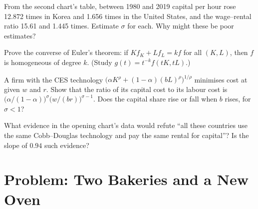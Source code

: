 \begin{exercise}[$\star\star$]\label{exo:b1:technology:estimate}
From the second chart's table, between 1980 and 2019 capital per hour rose
12.872 times in Korea and 1.656 times in the United States, and the
wage--rental ratio 15.61 and 1.445 times. %
Estimate $\sigma$ for each. Why might these be poor estimates?
\end{exercise}

\begin{exercise}[$\star\star\star$]\label{exo:b1:technology:euler-proof}
Prove the converse of Euler's theorem: if $Kf_K + Lf_L = kf$ for all
$(K, L)$, then $f$ is homogeneous of degree $k$. (Study
$g(t) = t^{-k}f(tK, tL)$.)
\end{exercise}

\begin{exercise}[$\star\star\star$]\label{exo:b1:technology:augmenting}
A firm with the CES technology $\bigl(\alpha K^\rho + (1 - \alpha)(bL)^\rho\bigr)^{1/\rho}$ minimises
cost at given $w$ and $r$. Show that the ratio of its capital cost to its
labour cost is $\bigl(\alpha/(1 - \alpha)\bigr)^\sigma\bigl(w/(br)\bigr)^{\sigma - 1}$. Does the
capital share rise or fall when $b$ rises, for $\sigma < 1$?
\end{exercise}

\begin{exercise}[$\star\star\star$]\label{exo:b1:technology:refute}
What evidence in the opening chart's data would refute ``all these
countries use the same Cobb--Douglas technology and pay the same rental for
capital''? Is the slope of $0.94$ such evidence?
\end{exercise}

\section{Problem: Two Bakeries and a New Oven}\label{sec:b1:technology:problem}

